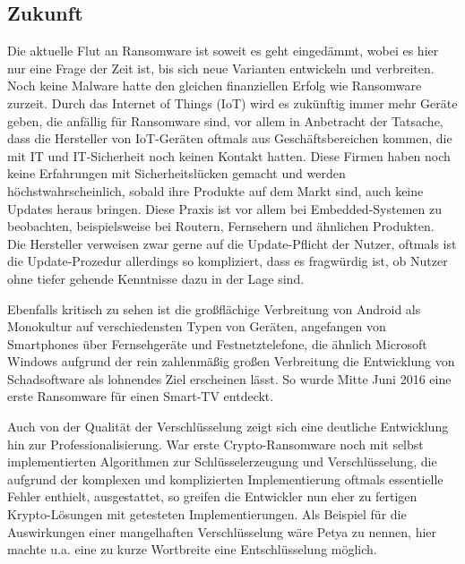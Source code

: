 \subsection{Zukunft}

Die aktuelle Flut an Ransomware ist soweit es geht eingedämmt, wobei es hier nur eine Frage der Zeit ist, bis sich neue Varianten entwickeln und verbreiten. Noch keine Malware hatte den gleichen finanziellen Erfolg wie Ransomware zurzeit. Durch das Internet of Things (IoT) wird es zukünftig immer mehr Geräte geben, die anfällig für Ransomware sind, vor allem in Anbetracht der Tatsache, dass die Hersteller von IoT-Geräten oftmals aus Geschäftsbereichen kommen, die mit IT und IT-Sicherheit noch keinen Kontakt hatten. Diese Firmen haben noch keine Erfahrungen mit Sicherheitslücken gemacht und werden höchstwahrscheinlich, sobald ihre Produkte auf dem Markt sind, auch keine Updates heraus bringen. Diese Praxis ist vor allem bei Embedded-Systemen zu beobachten, beispielsweise bei Routern, Fernsehern und ähnlichen Produkten.\\
Die Hersteller verweisen zwar gerne auf die Update-Pflicht der Nutzer, oftmals ist die Update-Prozedur allerdings so kompliziert, dass es fragwürdig ist, ob Nutzer ohne tiefer gehende Kenntnisse dazu in der Lage sind.

Ebenfalls kritisch zu sehen ist die großflächige Verbreitung von Android als Monokultur auf verschiedensten Typen von Geräten, angefangen von Smartphones über Fernsehgeräte und Festnetztelefone, die ähnlich Microsoft Windows aufgrund der rein zahlenmäßig großen Verbreitung die Entwicklung von Schadsoftware als lohnendes Ziel erscheinen lässt. So wurde Mitte Juni 2016 eine erste Ransomware für einen Smart-TV entdeckt. \cite{smarttv}

Auch von der Qualität der Verschlüsselung zeigt sich eine deutliche Entwicklung hin zur Professionalisierung. War erste Crypto-Ransomware noch mit selbst implementierten Algorithmen zur Schlüsselerzeugung und Verschlüsselung, die aufgrund der komplexen und komplizierten Implementierung oftmals essentielle Fehler enthielt, ausgestattet, so greifen die Entwickler nun eher zu fertigen Krypto-Lösungen mit getesteten Implementierungen. Als Beispiel für die Auswirkungen einer mangelhaften Verschlüsselung wäre Petya zu nennen, hier machte u.a. eine zu kurze Wortbreite eine Entschlüsselung möglich. \cite{petya:decrypt}